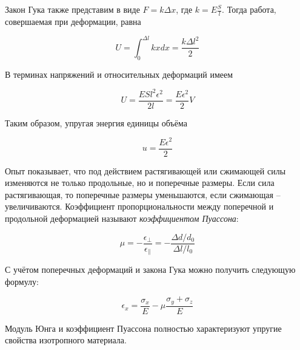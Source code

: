 Закон Гука также представим в виде $F = k \Delta x$, где $k = E \frac{S}{l}$. Тогда работа, совершаемая при деформации, равна

\begin{equation}
    U = \int_0^{\Delta l} k x dx = \frac{k \Delta l^2}{2}
\end{equation}

\noindent
В терминах напряжений и относительных деформаций имеем

\begin{equation}
    U = \frac{E S l^2 \epsilon^2}{2 l} = \frac{E \epsilon^2}{2} V
\end{equation}

\noindent
Таким образом, упругая энергия единицы объёма

\begin{equation}
    u = \frac{E \epsilon^2}{2}
\end{equation}

Опыт показывает, что под действием растягивающей или сжимающей силы изменяются не только продольные, но и поперечные размеры. Если сила растягивающая, то поперечные размеры уменьшаются, если сжимающая -- увеличиваются. Коэффициент пропорциональности между поперечной и продольной деформацией называют \textit{коэффициентом Пуассона}:

\begin{equation}
    \mu = - \frac{\epsilon_\perp}{\epsilon_\parallel} = - \frac{\Delta d / d_0}{\Delta l / l_0}
\end{equation}

\noindent
С учётом поперечных деформаций и закона Гука можно получить следующую формулу:

\begin{equation}
    \epsilon_x = \frac{\sigma_x}{E} - \mu \frac{\sigma_y + \sigma_z}{E}
\end{equation}

Модуль Юнга и коэффициент Пуассона полностью характеризуют упругие свойства изотропного материала.